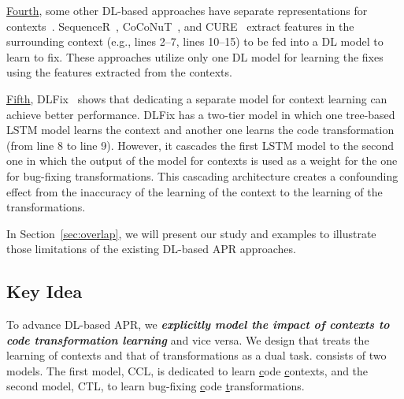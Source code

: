\underline{Fourth}, some other DL-based approaches have separate
representations for
contexts~\cite{chen2018sequencer,cure-icse21,lutellier2020coconut}.
SequenceR~\cite{chen2018sequencer},
CoCoNuT~\cite{lutellier2020coconut}, and CURE~\cite{cure-icse21}
extract features in the surrounding context (e.g., lines 2--7, lines
10--15) to be fed into a DL model to learn to fix. These approaches
utilize only one DL model for learning the fixes using the features
extracted from the contexts.


\underline{Fifth}, DLFix~\cite{icse20} shows that dedicating a
separate model for context learning can achieve better performance.
DLFix has a two-tier model in which one tree-based LSTM model learns
the context and another one learns the code transformation (from line
8 to line 9). However, it cascades the first LSTM model to the second
one in which the output of the model for contexts is used as a weight
for the one for bug-fixing transformations. This cascading
architecture creates a confounding effect from the inaccuracy of the
learning of the context to the learning of the transformations.

In Section~\ref{sec:overlap}, we will present our study and examples
to illustrate those limitations of the existing DL-based APR approaches.

\subsection{Key Idea}
\label{sec:key-idea}


To advance DL-based APR, we {\bf {\em explicitly model the impact of
  contexts to code transformation learning}} and vice versa.
We design {\tool} that treats the learning of contexts and
that of transformations as a dual task. {\tool}
consists of two models. The first model, CCL, is dedicated to
learn \underline{c}ode \underline{c}ontexts, and the second model, CTL, to
learn bug-fixing \underline{c}ode \underline{t}ransformations.



